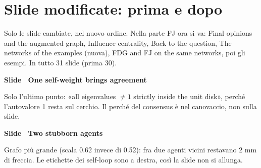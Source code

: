 \section*{Slide modificate: prima e dopo}
Solo le slide cambiate, nel nuovo ordine. Nella parte FJ ora si va: Final opinions and the augmented graph, Influence centrality, Back to the question, The networks of the examples (nuova), FDG and FJ on the same networks, poi gli esempi. In tutto 31 slide (prima 30).
\par\addvspace{14pt}\noindent\begin{minipage}{\textwidth}
{\color{unipd}\bfseries Slide  \textperiodcentered\ One self-weight brings agreement}\par\smallskip
{\small Solo l'ultimo punto: «all eigenvalues $\neq 1$ strictly inside the unit disk», perché l'autovalore 1 resta sul cerchio. Il perché del consensus è nel canovaccio, non sulla slide.}\par\smallskip
\noindent\begin{minipage}[t]{0.36\textwidth}\par
{}\par\smallskip
\end{minipage}\hfill\begin{minipage}[t]{0.61\textwidth}\par
{}\par\smallskip
\end{minipage}\par
\end{minipage}\par
\par\addvspace{14pt}\noindent\begin{minipage}{\textwidth}
{\color{unipd}\bfseries Slide  \textperiodcentered\ Two stubborn agents}\par\smallskip
{\small Grafo più grande (scala 0.62 invece di 0.52): fra due agenti vicini restavano 2 mm di freccia. Le etichette dei self-loop sono a destra, così la slide non si allunga.}\par\smallskip
\noindent\begin{minipage}[t]{0.36\textwidth}\par
{}\par\smallskip
\end{minipage}\hfill\begin{minipage}[t]{0.61\textwidth}\par
{}\par\smallskip
\end{minipage}\par
\end{minipage}\par

